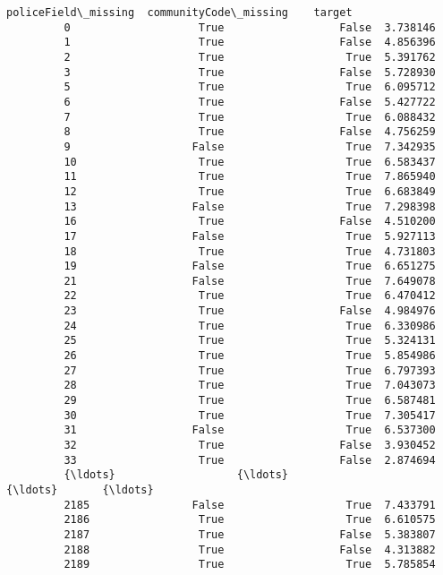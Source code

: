 \documentclass[11pt]{llncs}
\begin{document}
\begin{Verbatim}[commandchars=\\\{\}]
               policeField\_missing  communityCode\_missing    target  
         0                    True                  False  3.738146  
         1                    True                  False  4.856396  
         2                    True                   True  5.391762  
         3                    True                  False  5.728930  
         5                    True                   True  6.095712  
         6                    True                  False  5.427722  
         7                    True                   True  6.088432  
         8                    True                  False  4.756259  
         9                   False                   True  7.342935  
         10                   True                   True  6.583437  
         11                   True                   True  7.865940  
         12                   True                   True  6.683849  
         13                  False                   True  7.298398  
         16                   True                  False  4.510200  
         17                  False                   True  5.927113  
         18                   True                   True  4.731803  
         19                  False                   True  6.651275  
         21                  False                   True  7.649078  
         22                   True                   True  6.470412  
         23                   True                  False  4.984976  
         24                   True                   True  6.330986  
         25                   True                   True  5.324131  
         26                   True                   True  5.854986  
         27                   True                   True  6.797393  
         28                   True                   True  7.043073  
         29                   True                   True  6.587481  
         30                   True                   True  7.305417  
         31                  False                   True  6.537300  
         32                   True                  False  3.930452  
         33                   True                  False  2.874694  
         {\ldots}                   {\ldots}                    {\ldots}       {\ldots}  
         2185                False                   True  7.433791  
         2186                 True                   True  6.610575  
         2187                 True                  False  5.383807  
         2188                 True                  False  4.313882  
         2189                 True                   True  5.785854  

\end{Verbatim}
\end{document}
